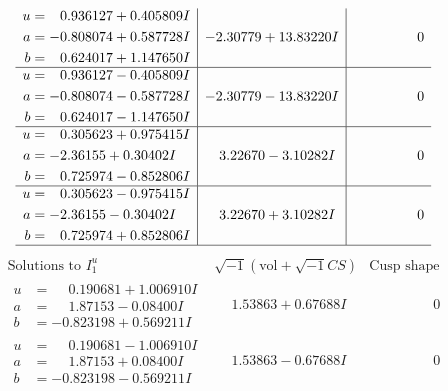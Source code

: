\documentclass[1p]{elsarticle_modified}
\theoremstyle{definition}
\newcommand{\I}{\sqrt{-1}}
\begin{document}
$$\begin{array}{c|c|c}
\begin{aligned}
u &= \phantom{-}0.936127 + 0.405809 I \\
a &= -0.808074 + 0.587728 I \\
b &= \phantom{-}0.624017 + 1.147650 I\end{aligned}
 & -2.30779 + 13.83220 I & \phantom{-0.000000 } 0 \\ \hline\begin{aligned}
u &= \phantom{-}0.936127 - 0.405809 I \\
a &= -0.808074 - 0.587728 I \\
b &= \phantom{-}0.624017 - 1.147650 I\end{aligned}
 & -2.30779 - 13.83220 I & \phantom{-0.000000 } 0 \\ \hline\begin{aligned}
u &= \phantom{-}0.305623 + 0.975415 I \\
a &= -2.36155 + 0.30402 I \\
b &= \phantom{-}0.725974 - 0.852806 I\end{aligned}
 & \phantom{-}3.22670 - 3.10282 I & \phantom{-0.000000 } 0 \\ \hline\begin{aligned}
u &= \phantom{-}0.305623 - 0.975415 I \\
a &= -2.36155 - 0.30402 I \\
b &= \phantom{-}0.725974 + 0.852806 I\end{aligned}
 & \phantom{-}3.22670 + 3.10282 I & \phantom{-0.000000 } 0\\
 \hline 
 \end{array}$$\newpage$$\begin{array}{c|c|c}  
\text{Solutions to }I^u_{1}& \I (\text{vol} + \sqrt{-1}CS) & \text{Cusp shape}\\
 \hline 
\begin{aligned}
u &= \phantom{-}0.190681 + 1.006910 I \\
a &= \phantom{-}1.87153 - 0.08400 I \\
b &= -0.823198 + 0.569211 I\end{aligned}
 & \phantom{-}1.53863 + 0.67688 I & \phantom{-0.000000 } 0 \\ \hline\begin{aligned}
u &= \phantom{-}0.190681 - 1.006910 I \\
a &= \phantom{-}1.87153 + 0.08400 I \\
b &= -0.823198 - 0.569211 I\end{aligned}
 & \phantom{-}1.53863 - 0.67688 I & \phantom{-0.000000 } 0 \\ \hline\begin{aligned}

\end{aligned}
\end{array}$$
\end{document}
